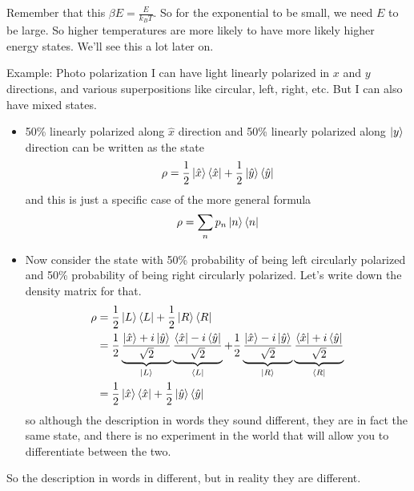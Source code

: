 Remember that this $\beta E = \frac{E}{k_B T}$.
So for the exponential to be small,
we need $E$ to be large.
So higher temperatures are more likely to have more likely higher energy states.
We'll see this a lot later on.


Example: Photo polarization
I can have light linearly polarized in $x$ and $y$ directions,
and various superpositions like circular, left, right, etc.
But I can also have mixed states.
\begin{itemize}
    \item 50\% linearly polarized along $\hat{x}$ direction and
        50\% linearly polarized along $\ket{y}$ direction
        can be written as the state
        \begin{align}
            \rho =
            \frac{1}{2}\ket{\hat{x}}\bra{\hat{x}}
            + \frac{1}{2}\ket{\hat{y}}\bra{\hat{y}}
        \end{align}
        and this is just a specific case of the more general formula
        \begin{align}
            \rho = \sum_n p_n \ket{n}\bra{n}
        \end{align}
    \item Now consider the state with
        50\% probability of being left circularly polarized
        and 50\% probability of being right circularly polarized.
        Let's write down the density matrix for that.
        \begin{align}
            \rho &=
            \frac{1}{2} \ket{L}\bra{L}
            + \frac{1}{2} \ket{R}\bra{R}\\
            &=
            \frac{1}{2}
            \underbrace{
                \frac{
                    \ket{\hat{x}} + i\ket{\hat{y}}
                }{\sqrt{2}}
            }_{\ket{L}}
            \underbrace{
                \frac{
                    \bra{\hat{x}} - i\bra{\hat{y}}
                }{\sqrt{2}}
            }_{\bra{L}}
            + \frac{1}{2}
            \underbrace{
                \frac{
                    \ket{\hat{x}} - i\ket{\hat{y}}
                }{\sqrt{2}}
            }_{\ket{R}}
            \underbrace{
                \frac{
                    \bra{\hat{x}} + i\bra{\hat{y}}
                }{\sqrt{2}}
            }_{\bra{R}}\\
            &= \frac{1}{2}\ket{\hat{x}}\bra{\hat{x}}
            + \frac{1}{2}\ket{\hat{y}}\bra{\hat{y}}
        \end{align}
        so although the description in words they sound different,
        they are in fact the same state,
        and there is no experiment in the world that will allow you to
        differentiate between the two.
\end{itemize}
So the description in words in different,
but in reality they are different.

